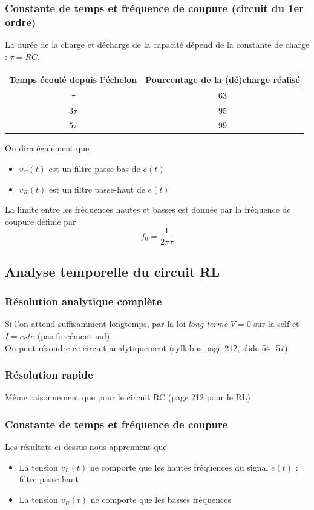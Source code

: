 \documentclass	[11pt, a4paper, openany]{book}
\begin{document}
\subsubsection{Constante de temps et fréquence de coupure (circuit du 1er ordre)}
La durée de la charge et décharge de la capacité dépend de la constante de charge : $\tau = RC$.
\begin{center}
\begin{tabular}{|c|c|}
\hline 
Temps écoulé depuis l'échelon & Pourcentage de la (dé)charge réalisé \\ 
\hline 
$\tau$ & 63 \\ 
\hline 
$3\tau$ & 95 \\ 
\hline 
$5\tau$ & 99 \\ 
\hline 
\end{tabular} 
\end{center}
On dira également que
\begin{itemize}
\item $v_C(t)$ est un filtre passe-bas de $e(t)$
\item $v_R(t)$ est un filtre passe-haut de $e(t)$
\end{itemize}
La limite entre les fréquences hautes et basses est donnée par la fréquence de coupure définie par
\begin{equation}
f_0 = \frac{1}{2\pi\tau}
\end{equation}
\subsection{Analyse temporelle du circuit RL}
\subsubsection{Résolution analytique complète}
Si l'on attend suffisamment longtemps, par la loi \textit{long terme} $V = 0$ sur la self et $I = cste$ (pas forcément nul).\\
On peut résoudre ce circuit analytiquement (syllabus page 212, slide 54- 57)

\subsubsection{Résolution rapide}
Même raisonnement que pour le circuit RC (page 212 pour le RL)

\subsubsection{Constante de temps et fréquence de coupure}
Les résultats ci-dessus nous apprennent que
\begin{itemize}
\item La tension $v_L(t)$ ne comporte que les hautes fréquences du signal $e(t)$ : filtre passe-haut
\item La tension $v_R(t)$ ne comporte que les basses fréquences
\end{itemize}
 
\end{document}
